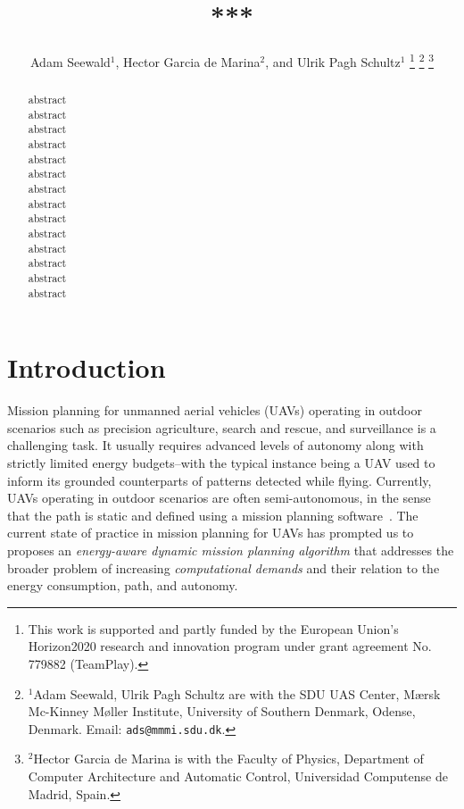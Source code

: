 \documentclass[letterpaper,10pt,conference]{ieeeconf}
\title{\LARGE \bf
***
}
\author{
  Adam Seewald$^{1}$, Hector Garcia de Marina$^{2}$, and Ulrik Pagh Schultz$^{1}$
  \thanks{This work is supported and partly funded by the European Union's Horizon2020 research and innovation program under grant agreement No. 779882 (TeamPlay).
  }
  \thanks{$^{1}$Adam Seewald, Ulrik Pagh Schultz are with the SDU UAS Center, M{\ae}rsk Mc-Kinney M{\o}ller Institute, University of Southern Denmark, Odense, Denmark. Email: {\tt\small ads@mmmi.sdu.dk}.}
  \thanks{$^{2}$Hector Garcia de Marina is with the Faculty of Physics, Department of Computer Architecture and Automatic Control, Universidad Computense de Madrid, Spain.}
}
\begin{document}
\maketitle

\thispagestyle{empty}
\pagestyle{empty}

\begin{abstract}

  abstract\\
  abstract\\
  abstract\\
  abstract\\
  abstract\\
  abstract\\
  abstract\\
  abstract\\
  abstract\\
  abstract\\
  abstract\\
  abstract\\
  abstract\\
  abstract
\end{abstract}

%
\IEEEpeerreviewmaketitle


\section{Introduction}
\label{sec:intro}


Mission planning for unmanned aerial vehicles (UAVs) operating in outdoor scenarios such as precision agriculture, search and rescue, and surveillance is a challenging task. It usually requires advanced levels of autonomy along with strictly limited energy budgets--with the typical instance being a UAV used to inform its grounded counterparts of patterns detected while flying. Currently, UAVs operating in outdoor scenarios are often semi-autonomous, in the sense that the path is static and defined using a mission planning software~\cite{daponte2019review}. The current state of practice in mission planning for UAVs has prompted us to proposes an \emph{energy-aware dynamic mission planning algorithm} that addresses the broader problem of increasing \emph{computational demands} and their relation to the energy consumption, path, and autonomy.
\end{document}
